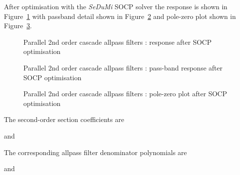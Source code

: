 \documentclass[a4paper,twoside,10pt,english]{report}
\begin{document}
After optimisation with the \emph{SeDuMi} SOCP solver the response is shown in
Figure~\ref{fig:Parallel-2nd-order-cascade-allpass-filter-SOCP-response} with
passband detail shown in
Figure~\ref{fig:Parallel-2nd-order-cascade-allpass-filter-SOCP-passband-response}
and pole-zero plot shown in
Figure~\ref{fig:Parallel-2nd-order-cascade-allpass-filter-SOCP-pz}.
\begin{figure}[!htbp]
\begin{center}
\scalebox{0.7}{}
\caption{Parallel 2nd order cascade allpass filters : response after SOCP optimisation}
\label{fig:Parallel-2nd-order-cascade-allpass-filter-SOCP-response}
\end{center}
\end{figure}
\begin{figure}[!htbp]
\begin{center}
\scalebox{0.7}{}
\caption{Parallel 2nd order cascade allpass filters : pass-band response after SOCP optimisation}
\label{fig:Parallel-2nd-order-cascade-allpass-filter-SOCP-passband-response}
\end{center}
\end{figure}
\begin{figure}[!htbp]
\begin{center}
\scalebox{0.7}{}
\caption{Parallel 2nd order cascade allpass filters : pole-zero plot after SOCP optimisation}
\label{fig:Parallel-2nd-order-cascade-allpass-filter-SOCP-pz}
\end{center}
\end{figure}
The second-order section coefficients are
\begin{small}

\end{small}
and
\begin{small}

\end{small}
The corresponding allpass filter denominator polynomials are
\begin{small}

\end{small}
and
\begin{small}

\end{small}
\end{document}
